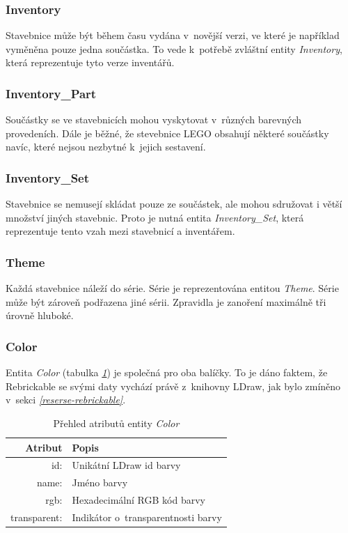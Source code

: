 \subsubsection*{Inventory}
Stavebnice může být během času vydána v~novější verzi, ve které je například vyměněna pouze jedna součástka. To vede k~potřebě zvláštní entity \textit{Inventory}, která reprezentuje tyto verze inventářů. 

\subsubsection*{Inventory\_Part} 
Součástky se ve stavebnicích mohou vyskytovat v~různých barevných provedeních. Dále je běžné, že stevebnice LEGO obsahují některé součástky navíc, které nejsou nezbytné k~jejich sestavení.

\subsubsection*{Inventory\_Set}
Stavebnice se nemusejí skládat pouze ze součástek, ale mohou sdružovat i větší množství jiných stavebnic. Proto je nutná entita \textit{Inventory\_Set}, která reprezentuje tento vzah mezi stavebnicí a inventářem.

\subsubsection*{Theme}
Každá stavebnice náleží do série. Série je reprezentována entitou \textit{Theme}. Série může být zároveň podřazena jiné sérii. Zpravidla je zanoření maximálně tři úrovně hluboké.

\subsubsection*{Color} 
Entita \textit{Color} (tabulka \emph{\ref{table:entity:color}}) je společná pro oba balíčky. To je dáno faktem, že Rebrickable se svými daty vychází právě z~knihovny LDraw, jak bylo zmíněno v~sekci \emph{\ref{reserse-rebrickable}}.

\begin{table}[th!]
  \centering
  \caption{Přehled atributů entity \textit{Color}}
  \label{table:entity:color}
  \begin{tabularx}{\textwidth}{@{}rX@{}}
  \toprule
  Atribut & Popis
  \\ \midrule
  id: & Unikátní LDraw id barvy \autocite{ldraw:colors}
  \\
  name: & Jméno barvy
  \\
  rgb: & Hexadecimální \gls{RGB} kód barvy 
  \\
  transparent: & Indikátor o~transparentnosti barvy
  \\
  \bottomrule
  \end{tabularx}
\end{table}

